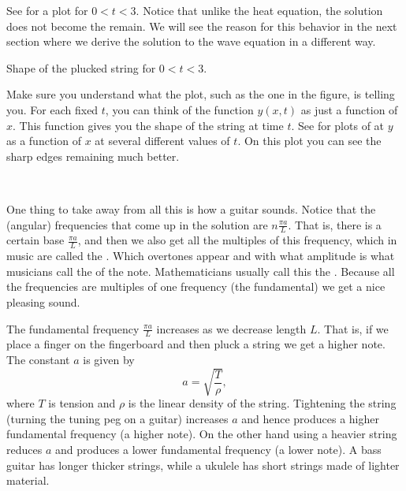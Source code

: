 \begin{example}
See 
 for a plot
for $0 < t < 3$.  Notice
that unlike the heat equation, the solution does not become
the  remain.  We will see the reason for this behavior in the
next section where we derive the solution to the wave equation in a different
way.

\begin{myfig}
\capstart
{}
\caption{Shape of the plucked string for $0 < t < 3$.\label{wave:pluckedexfig}}
\end{myfig}

Make sure you understand what the plot, such as the one in the figure, is
telling you.  For each fixed $t$, you can think of the function 
$y(x,t)$ as just a function of $x$.  This function gives you the shape of the
string at time $t$.  See  for plots of
at $y$ as a function of $x$ at several different values of $t$.
On this plot you can see the sharp edges remaining much better.

\begin{myfig}
\capstart
\\[5pt]
\caption{Plucked string for $t=0$, $t=0.4$, $t=0.8$, and
$t=1.2$.%
\label{wave:pluckedtsfig}}
\end{myfig}
\end{example}

One thing to take away from all this is how a guitar sounds.  Notice that
the (angular) frequencies that come up in the solution are
$n \frac{\pi a}{L}$.  That is, there is a certain base
\emph{} $\frac{\pi a}{L}$, and then we also
get all the multiples of this frequency, which in music are called
the \emph{}.  Which overtones appear and with what amplitude
is what musicians call the \emph{} of the note.
Mathematicians usually call this the \emph{}.
Because all the frequencies are multiples of one frequency (the fundamental)
we get a nice pleasing sound.

The fundamental frequency $\frac{\pi a}{L}$ increases as we decrease length $L$.  That is, if
we place a finger on the fingerboard and then pluck a string we get a higher
note.  The constant $a$ is given by
\begin{equation*}
a = \sqrt{\frac{T}{\rho}} ,
\end{equation*}
where $T$ is tension and $\rho$ is the linear density of the string.
Tightening the string (turning the tuning peg on a guitar) increases $a$ and
hence produces a higher fundamental frequency (a higher note).
On the other hand using a heavier string 
reduces $a$ and produces a lower fundamental frequency (a lower note).
A bass guitar has longer thicker strings, while a ukulele has short strings
made of lighter material.

